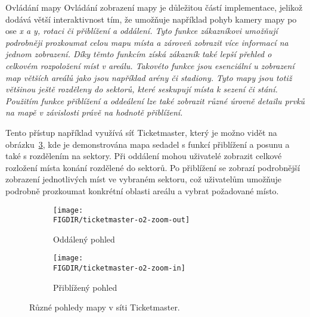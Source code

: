 \begin{subsection}{Ovládání mapy}
    \label{subsec:identifikace-interaktivni-mapa-ovladani}
    Ovládání zobrazení mapy je důležitou částí implementace, jelikož dodává větší interaktivnost tím, že umožňuje například pohyb kamery mapy po ose \em{x} a \em{y}, rotaci či přiblížení a oddálení.
    Tyto funkce zákazníkovi umožňují podrobněji prozkoumat celou mapu místa a zároveň zobrazit více informací na jednom zobrazení.
    Díky těmto funkcím získá zákazník také lepší přehled o celkovém rozpoložení míst v areálu.
    Takovéto funkce jsou esenciální u zobrazení map větších areálů jako jsou například arény či stadiony.
    Tyto mapy jsou totiž většinou ještě rozděleny do sektorů, které seskupují místa k sezení či stání.
    Použitím funkce přiblížení a oddeálení lze také zobrazit různé úrovně detailu prvků na mapě v závislosti právě na hodnotě přiblížení.

    Tento přístup například využívá síť Ticketmaster, který je možno vidět na obrázku~\ref{fig:ticketmaster-o2-zoom}, kde je demonstrována mapa sedadel s funkcí přiblížení a posunu a také s rozdělením na sektory.
    Při oddálení mohou uživatelé zobrazit celkové rozložení místa konání rozdělené do sektorů.
    Po přiblížení se zobrazí podrobnější zobrazení jednotlivých míst ve vybraném sektoru, což uživatelům umožňuje podrobně prozkoumat konkrétní oblasti areálu a vybrat požadované místo.

    \begin{figure}[H]
        \centering
        \begin{subfigure}{0.45\textwidth}
            \texttt{[image: \\FIGDIR/ticketmaster-o2-zoom-out]}
            \caption{Oddálený pohled}
            \label{fig:ticketmaster-o2-zoom-in}
        \end{subfigure}
        \hfill
        \begin{subfigure}{0.45\textwidth}
            \texttt{[image: \\FIGDIR/ticketmaster-o2-zoom-in]}
            \caption{Přiblížený pohled}
            \label{fig:ticketmaster-o2-zoom-out}
        \end{subfigure}

        \caption{Různé pohledy mapy v síti Ticketmaster.\cite{t__www_ticketmaster_com}}
        \label{fig:ticketmaster-o2-zoom}
    \end{figure}


\end{subsection}
